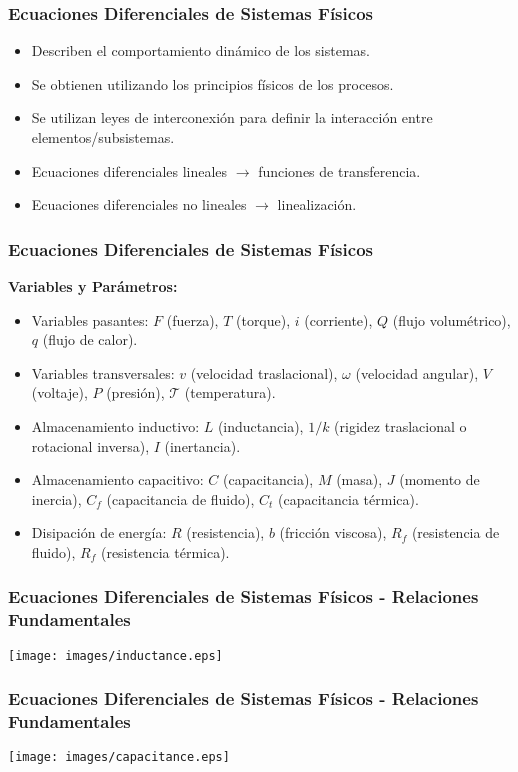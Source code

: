 \documentclass[aspectratio=169,handout]{beamer}
\theoremstyle{definition}
\theoremstyle{plain}
\theoremstyle{remark}
\begin{document}
\begin{frame}[<+->]\frametitle{Ecuaciones Diferenciales de Sistemas Físicos}
  \begin{itemize}
    \item Describen el comportamiento dinámico de los sistemas.
    \item Se obtienen utilizando los principios físicos de los procesos.
    \item Se utilizan leyes de interconexión para definir la interacción entre elementos/subsistemas.
    \item Ecuaciones diferenciales lineales $\rightarrow$ funciones de transferencia.
    \item Ecuaciones diferenciales no lineales $\rightarrow$ linealización.
  \end{itemize}
\end{frame}

\begin{frame}[<+->]\frametitle{Ecuaciones Diferenciales de Sistemas Físicos}
  \textbf{Variables y Parámetros:}
  \begin{itemize}
    \item Variables pasantes: $F$ (fuerza), $T$ (torque), $i$ (corriente), $Q$ (flujo volumétrico), $q$ (flujo de calor).
    \item Variables transversales: $v$ (velocidad traslacional), $\omega$ (velocidad angular), $V$ (voltaje), $P$ (presión), $\mathcal{T}$ (temperatura).
    \item Almacenamiento inductivo: $L$ (inductancia), $1/k$ (rigidez traslacional o rotacional inversa), $I$ (inertancia).
    \item Almacenamiento capacitivo: $C$ (capacitancia), $M$ (masa), $J$ (momento de inercia), $C_f$ (capacitancia de fluido), $C_t$ (capacitancia térmica).
    \item Disipación de energía: $R$ (resistencia), $b$ (fricción viscosa), $R_f$ (resistencia de fluido), $R_f$ (resistencia térmica).
  \end{itemize}
\end{frame}

\begin{frame}[<+->]\frametitle{Ecuaciones Diferenciales de Sistemas Físicos - Relaciones Fundamentales}
\centering
\texttt{[image: images/inductance.eps]}
\end{frame}

\begin{frame}[<+->]\frametitle{Ecuaciones Diferenciales de Sistemas Físicos - Relaciones Fundamentales}
\centering
\texttt{[image: images/capacitance.eps]}
\end{frame}
\end{document}
